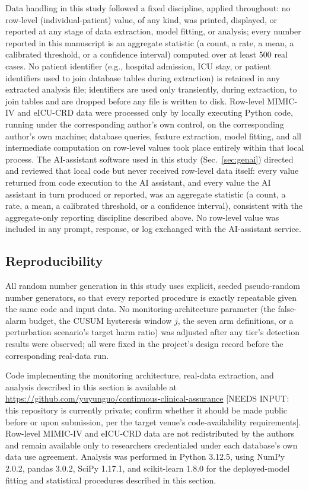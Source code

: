 \documentclass[apajournal,article,submit,oneauthor]{Definitions/mdpi}
\begin{document}
Data handling in this study followed a fixed discipline, applied throughout: no row-level (individual-patient) value, of any kind, was printed, displayed, or reported at any stage of data extraction, model fitting, or analysis; every number reported in this manuscript is an aggregate statistic (a count, a rate, a mean, a calibrated threshold, or a confidence interval) computed over at least 500 real cases. No patient identifier (e.g., hospital admission, ICU stay, or patient identifiers used to join database tables during extraction) is retained in any extracted analysis file; identifiers are used only transiently, during extraction, to join tables and are dropped before any file is written to disk. Row-level MIMIC-IV and eICU-CRD data were processed only by locally executing Python code, running under the corresponding author's own control, on the corresponding author's own machine; database queries, feature extraction, model fitting, and all intermediate computation on row-level values took place entirely within that local process. The AI-assistant software used in this study (Sec.~\ref{sec:genai}) directed and reviewed that local code but never received row-level data itself: every value returned from code execution to the AI assistant, and every value the AI assistant in turn produced or reported, was an aggregate statistic (a count, a rate, a mean, a calibrated threshold, or a confidence interval), consistent with the aggregate-only reporting discipline described above. No row-level value was included in any prompt, response, or log exchanged with the AI-assistant service.

\subsection{Reproducibility}\label{sec:reproducibility}

All random number generation in this study uses explicit, seeded pseudo-random number generators, so that every reported procedure is exactly repeatable given the same code and input data. No monitoring-architecture parameter (the false-alarm budget, the CUSUM hysteresis window $j$, the seven arm definitions, or a perturbation scenario's target harm ratio) was adjusted after any tier's detection results were observed; all were fixed in the project's design record before the corresponding real-data run.

Code implementing the monitoring architecture, real-data extraction, and analysis described in this section is available at \url{https://github.com/yuyunguo/continuous-clinical-assurance} [NEEDS INPUT: this repository is currently private; confirm whether it should be made public before or upon submission, per the target venue's code-availability requirements]. Row-level MIMIC-IV and eICU-CRD data are not redistributed by the authors and remain available only to researchers credentialed under each database's own data use agreement. Analysis was performed in Python 3.12.5, using NumPy 2.0.2, pandas 3.0.2, SciPy 1.17.1, and scikit-learn 1.8.0 for the deployed-model fitting and statistical procedures described in this section.
\end{document}
